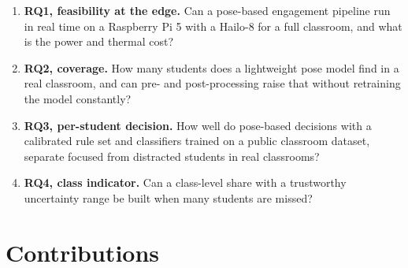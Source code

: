 \begin{enumerate}
\def\labelenumi{\arabic{enumi}.}
\tightlist
\item
  \textbf{RQ1, feasibility at the edge.} Can a pose-based engagement pipeline run in real time on a Raspberry Pi 5 with a Hailo-8 for a full classroom, and what is the power and thermal cost?
\item
  \textbf{RQ2, coverage.} How many students does a lightweight pose model find in a real classroom, and can pre- and post-processing raise that without retraining the model constantly?
\item
  \textbf{RQ3, per-student decision.} How well do pose-based decisions with a calibrated rule set and classifiers trained on a public classroom dataset, separate focused from distracted students in real classrooms?
\item
  \textbf{RQ4, class indicator.} Can a class-level share with a trustworthy uncertainty range be built when many students are missed?
\end{enumerate}

\section{Contributions}

